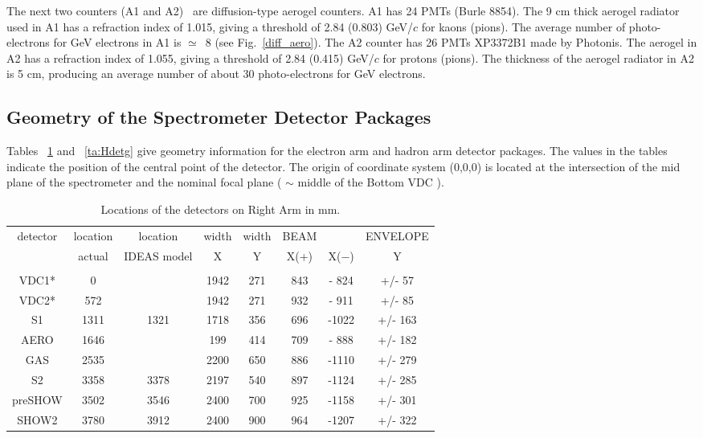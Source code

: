 The next two counters (A1 and A2)~\cite{a1a2} are diffusion-type aerogel 
counters. 
A1 has 24 PMTs (Burle 8854). 
The 9 cm thick aerogel radiator used in A1 has a refraction index of 1.015, 
giving a threshold of 2.84 (0.803) GeV/$c$ for kaons (pions). 
The average number of photo-electrons for GeV electrons 
in A1 is $\simeq$~8 (see Fig.~\ref{diff_aero}). The A2 counter has 26 PMTs  
XP3372B1 made by Photonis. 
The aerogel in A2 has a refraction index of 1.055, 
giving a threshold of 2.84 (0.415) GeV/$c$ for protons (pions). 
The thickness of the aerogel radiator in A2 is 5 cm, producing an average 
number of about 30 photo-electrons for GeV electrons.

\subsection{Geometry of the Spectrometer Detector Packages}

Tables ~\ref{ta:Edetg} and ~\ref{ta:Hdetg} give geometry
information for the electron arm and hadron arm detector packages. 
The values in the tables
indicate the position of the central point of the detector.
The origin of coordinate system (0,0,0) is located at the intersection of 
the mid plane of the spectrometer and the nominal focal
plane ( $\sim$ middle of the Bottom VDC ).

\begin{table}[hptb]
\begin{center}
\begin{tabular}{cccccccc}
detector&location&  location& width &   width &      BEAM  &        & ENVELOPE \\
        & actual &IDEAS model&   X  &     Y   &      X(+)&  X($-$) &   Y\\  \hline
       &        &          &        &         &          &         &           \\  \hline    
VDC1*   &      0 &          &   1942 &    271  &     843    & - 824  & +/-  57  \\
VDC2*   &     572&          &   1942 &    271  &     932    & - 911  & +/-  85  \\
S1      &    1311&     1321 &   1718 &    356  &     696    & -1022  & +/- 163  \\ 
AERO    &    1646&          &   199  &    414  &     709    & - 888  & +/- 182  \\
GAS     &    2535&          &   2200 &    650  &     886    & -1110  & +/- 279  \\ 
S2      &    3358&     3378 &   2197 &    540  &     897    & -1124  & +/- 285  \\
preSHOW &    3502&     3546 &   2400 &    700  &     925    & -1158  & +/- 301  \\ 
SHOW2   &    3780&     3912 &   2400 &    900  &     964    & -1207  & +/- 322  \\  \hline
\end{tabular}
\end{center}
\caption[Detectors: Right ARM Detector Locations]{Locations of
the detectors on Right Arm in mm.}
\label{ta:Edetg}
\end{table}

